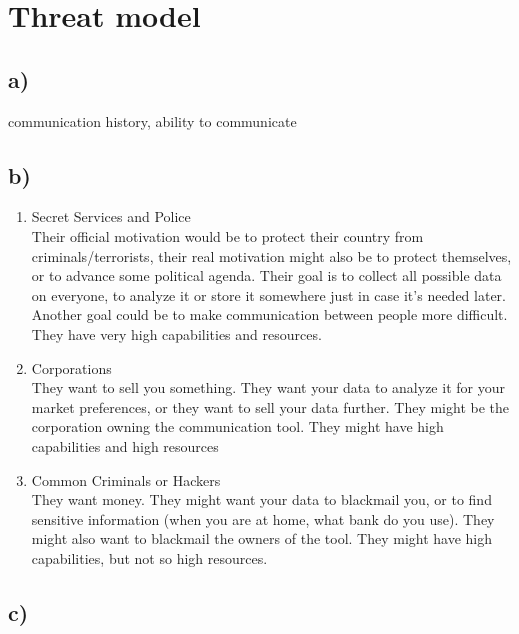 
\graphicspath{ {./src/} } 
\usepackage{hyperref}

\newcommand{\dozent}{Volker Roth}
\newcommand{\tutor}{Oliver Wiese}
\newcommand{\tutoriumNo}{02\\Materialien: Latex, VSC, Skript}
\newcommand{\ubungNo}{01}
\newcommand{\veranstaltung}{Rechnersicherheit}
\newcommand{\semester}{SoSe 21}






\section{Threat model}
\subsection* {a)}
communication history, ability to communicate
\subsection* {b)}
\begin{enumerate}
    \item Secret Services and Police \\
    Their official motivation would be to protect their country from criminals/terrorists, their real motivation might also be to protect themselves, or to advance some political agenda. Their goal is to collect all possible data on everyone, to analyze it or store it somewhere just in case it's needed later. Another goal could be to make communication between people more difficult. They have very high capabilities and resources.
    \item Corporations \\
    They want to sell you something. They want your data to analyze it for your market preferences, or they want to sell your data further. They might be the corporation owning the communication tool. They might have high capabilities and high resources 
    \item Common Criminals or Hackers \\
    They want money. They might want your data to blackmail you, or to find sensitive information (when you are at home, what bank do you use). They might also want to blackmail the owners of the tool. They might have high capabilities, but not so high resources.
\end{enumerate}
\subsection* {c)}
